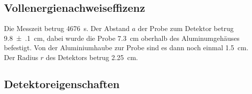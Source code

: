 \subsection{Vollenergienachweiseffizenz}
\label{sec:Vollenergienachweiseffizenz}
Die Messzeit betrug \SI{ 4676}{\second}. Der Abstand $a$ der Probe zum Detektor betrug
\SI{9.8(1)}{\centi\meter}, dabei wurde die Probe \SI{7.3}{\centi\meter} oberhalb
des Aluminumgehäuses befestigt. Von der Aluminiumhaube zur Probe sind es dann noch
einmal \SI{1.5}{\centi\meter}. Der Radius $r$ des Detektors betrug \SI{2.25}{\centi\meter}.

\subsection{Detektoreigenschaften}
\label{sec:Detektoreigenschaften}




